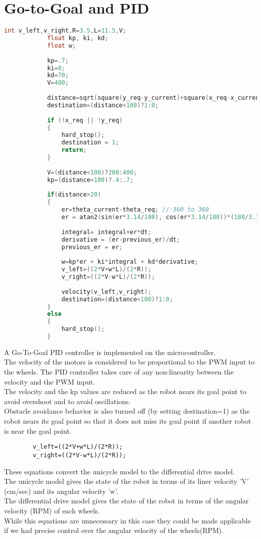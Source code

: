 \documentclass[main.tex]{subfiles}
\begin{document}
	\section{Go-to-Goal and PID}
		\begin{lstlisting}[language=C, caption = PID controller]
			int v_left,v_right,R=3.5,L=11.5,V;
			float kp, ki, kd;
			float w;
			
			kp=.7;
			ki=0;
			kd=70;
			V=400;
		
			distance=sqrt(square(y_req-y_current)+square(x_req-x_current));
			destination=(distance<100)?1:0;
			
			if (!x_req || !y_req)
			{
				hard_stop();
				destination = 1;
				return;
			}
			
			V=(distance<100)?200:400;
			kp=(distance<100)?.4:.7;
			
			if(distance>20)
			{
				er=theta_current-theta_req; //-360 to 360
				er = atan2(sin(er*3.14/180), cos(er*3.14/180))*(180/3.14); //-180 to 180
				
				integral= integral+er*dt;
				derivative = (er-previous_er)/dt;
				previous_er = er;
				
				w=kp*er + ki*integral + kd*derivative;
				v_left=((2*V+w*L)/(2*R));
				v_right=((2*V-w*L)/(2*R));
				
				velocity(v_left,v_right);
				destination=(distance<100)?1:0;
			}		
			else
			{
				hard_stop();
			}
		\end{lstlisting}
		A Go-To-Goal PID controller is implemented on the microcontroller.\\
		The velocity of the motors is considered to be proportional to the PWM input to the wheels. The PID controller takes care of any non-linearity between the velocity and the PWM input.\\
		The velocity and the kp values are reduced as the robot nears its goal point to avoid overshoot and to avoid oscillations.\\
		Obstacle avoidance behavior is also turned off (by setting destination=1) as the robot nears its goal point so that it does not miss its goal point if another robot is near the goal point.
		
		\begin{verbatim}
		v_left=((2*V+w*L)/(2*R));
		v_right=((2*V-w*L)/(2*R));
		\end{verbatim}
		
		These equations convert the unicycle model to the differential drive model.\\
		The unicycle model gives the state of the robot in terms of its liner velocity 'V' (cm/sec) and its angular velocity 'w'.\\
		The differential drive model gives the state of the robot in terms of the angular velocity (RPM) of each wheels.\\
		While this equations are unnecessary in this case they could be made applicable if we had precise control over the angular velocity of the wheels(RPM).\\
		
\end{document}
